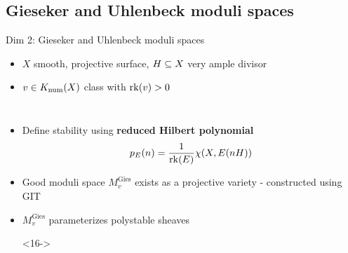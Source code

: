 \documentclass[8pt,handout]{beamer} %
\begin{document}
\subsection{Gieseker and Uhlenbeck moduli spaces}
\begin{frame}[fragile]{Dim 2: Gieseker and Uhlenbeck moduli spaces}
    \begin{itemize}
        \item<2->[] $X$ smooth, projective surface, $H \subseteq X$ very ample divisor
        \item<3->[] $v \in K_{\mathrm{num}}(X)$ class with $\operatorname{\mathrm{rk}}(v) > 0$
        \item[]
    \end{itemize}
    
    \begin{columns}[t]
        \begin{itemize}
            \item<5-> Define stability using \textbf{reduced Hilbert polynomial}
            \[ p_E(n) = \frac{1}{\operatorname{\mathrm{rk}}(E)} \chi(X, E(n H)) \]
            \item<7-> Good moduli space $M^{\text{Gies}}_v$ exists as a projective variety - constructed using GIT
            \item<8-> $M^{\text{Gies}}_v$ parameterizes polystable sheaves
            \item[]
            \item[]<16->
            \begin{center}
            \end{center}
        \end{itemize}
        

\end{columns}
\end{frame}
\end{document}
